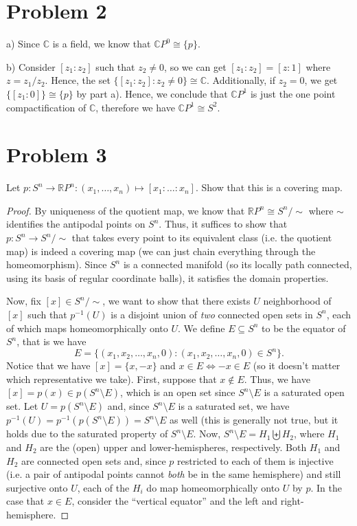 \documentclass[11pt]{article} %
\newcommand{\R}{\mathbb{R}}
\newcommand{\C}{\mathbb{C}}
\begin{document}
\section*{Problem 2}
a) Since $\C$ is a field, we know that $\C P^0 \cong \{p\}$.

b) Consider $[z_1:z_2]$ such that $z_2\ne 0$, so we can get $[z_1:z_2] = [z:1]$ where $z=z_1/z_2$. Hence, the set $\{[z_1:z_2]:z_2\ne 0\}\cong \C$. Additionally, if $z_2=0$, we get $\{[z_1:0]\}\cong \{p\}$ by part a). Hence, we conclude that $\C P^1$ is just the one point compactification of $\C$, therefore we have $\C P^1\cong S^2$.


\newpage
\section*{Problem 3}
Let $p:S^n\to\R P^n:(x_1,\dots,x_n)\mapsto[x_1:\ldots:x_n]$. Show that this is a covering map.

\begin{proof}
By uniqueness of the quotient map, we know that $\R P^n \cong S^n/\sim$ where $\sim$ identifies the antipodal points on $S^n$. Thus, it suffices to show that $p:S^n\to S^n/\sim$ that takes every point to its equivalent class (i.e. the quotient map) is indeed a covering map (we can just chain everything through the homeomorphism). Since $S^n$ is a connected manifold (so its locally path connected, using its basis of regular coordinate balls), it satisfies the domain properties. 

Now, fix $[x] \in S^n/\sim$, we want to show that there exists $U$ neighborhood of $[x]$ such that $p^{-1}(U)$ is a disjoint union of \emph{two} connected open sets in $S^n$, each of which maps homeomorphically onto $U$. We define $E\subseteq S^n$ to be the equator of $S^n$, that is we have
\[E =  \{(x_1,x_2,\ldots,x_n,0):(x_1,x_2,\ldots,x_n,0)\in S^n\}.\]
Notice that we have $[x]  =\{x,-x\}$ and $x\in E\iff -x\in E$ (so it doesn't matter which representative we take). First, suppose that $x\notin E$. Thus, we have $[x] = p(x) \in p(S^n\setminus E)$, which is an open set since $S^n\setminus E$ is a saturated open set. Let $U = p(S^n\setminus E)$ and, since $S^n\setminus E$ is a saturated set, we have $p^{-1}(U) = p^{-1}(p(S^n\setminus E)) = S^n\setminus E$ as well (this is generally not true, but it holds due to the saturated property of $S^n\setminus E$. Now, $S^n\setminus E = H_1\biguplus H_2$, where $H_1$ and $H_2$ are the (open) upper and lower-hemispheres, respectively. Both $H_1$ and $H_2$ are connected open sets and, since $p$ restricted to each of them is injective (i.e. a pair of antipodal points cannot \emph{both} be in the same hemisphere) and still surjective onto $U$, each of the $H_i$ do map homeomorphically onto $U$ by $p$. In the case that $x\in E$, consider the ``vertical equator'' and the left and right-hemisphere.
 \end{proof} 
\end{document}
